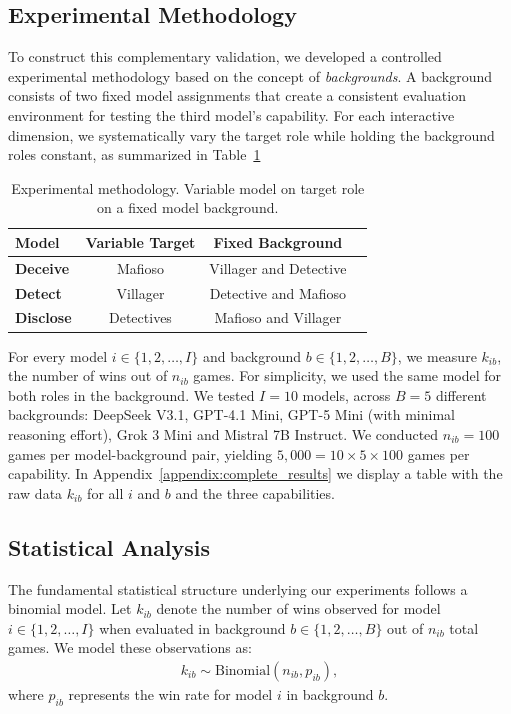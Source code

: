 \documentclass{article}
\begin{document}
\subsection{Experimental Methodology}
To construct this complementary validation, we developed a controlled experimental methodology based on the concept of \textit{backgrounds}. A background consists of two fixed model assignments that create a consistent evaluation environment for testing the third model's capability. For each interactive dimension, we systematically vary the target role while holding the background roles constant, as summarized in Table~\ref{tab:benchmark_methodology}


\begin{table}[t!]
    \centering
    \caption{Experimental methodology. Variable model on target role on a fixed model background.}
    \begin{tabular}{lccc}
        \toprule 
        \textbf{Model} & \textbf{Variable Target} & \textbf{Fixed Background}  \\ 
        \midrule
        \textbf{Deceive} &  Mafioso & Villager and Detective \\
        \textbf{Detect} & Villager & Detective and Mafioso \\
        \textbf{Disclose} & Detectives & Mafioso and Villager \\
        \bottomrule
    \end{tabular}
    \label{tab:benchmark_methodology}
\end{table}

For every model $i\in\{1,2,\dots,I\}$ and background $b\in\{1,2,\dots, B\}$, we measure $k_{ib}$, the number of wins out of $n_{ib}$ games. For simplicity, we used the same model for both roles in the background. We tested $I=10$ models, across $B=5$ different backgrounds: DeepSeek V3.1, GPT-4.1 Mini, GPT-5 Mini (with minimal reasoning effort), Grok 3 Mini and Mistral 7B Instruct. We conducted $n_{ib}=100$ games per model-background pair, yielding $5{,}000=10\times 5\times 100$ games per capability. In Appendix~\ref{appendix:complete_results} we display a table with the raw data $k_{ib}$ for all $i$ and $b$ and the three capabilities.

\subsection{Statistical Analysis}

The fundamental statistical structure underlying our experiments follows a binomial model. Let $k_{ib}$ denote the number of wins observed for model $i\in\{1,2,\dots,I\}$ when evaluated in background $b\in\{1,2,\dots,B\}$ out of $n_{ib}$ total games. We model these observations as:
\begin{align}
    k_{ib} \sim \text{Binomial}(n_{ib}, p_{ib}),
\end{align}
where $p_{ib}$ represents the win rate for model $i$ in background $b$.
\end{document}
